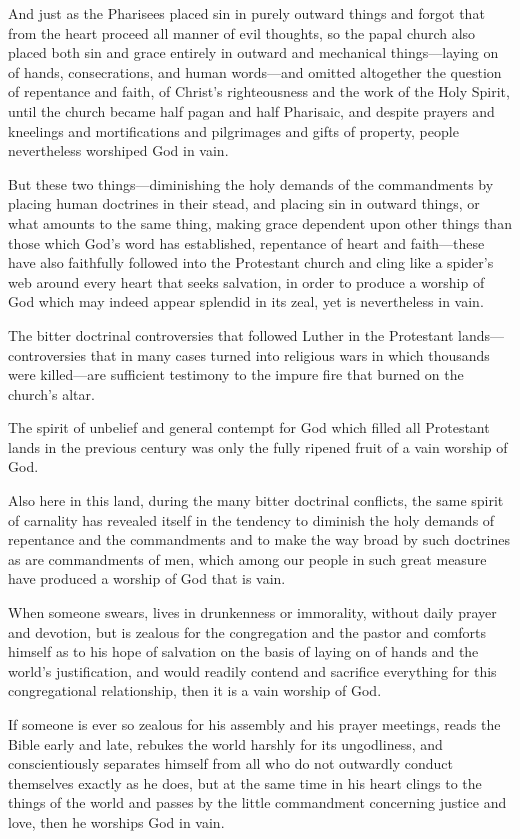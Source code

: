 And just as the Pharisees placed sin in purely outward things and forgot that from the heart proceed all manner of evil thoughts, so the papal church also placed both sin and grace entirely in outward and mechanical things—laying on of hands, consecrations, and human words—and omitted altogether the question of repentance and faith, of Christ's righteousness and the work of the Holy Spirit, until the church became half pagan and half Pharisaic, and despite prayers and kneelings and mortifications and pilgrimages and gifts of property, people nevertheless worshiped God in vain.

But these two things—diminishing the holy demands of the commandments by placing human doctrines in their stead, and placing sin in outward things, or what amounts to the same thing, making grace dependent upon other things than those which God's word has established, repentance of heart and faith—these have also faithfully followed into the Protestant church and cling like a spider’s web around every heart that seeks salvation, in order to produce a worship of God which may indeed appear splendid in its zeal, yet is nevertheless in vain.

The bitter doctrinal controversies that followed Luther in the Protestant lands—controversies that in many cases turned into religious wars in which thousands were killed—are sufficient testimony to the impure fire that burned on the church’s altar.

The spirit of unbelief and general contempt for God which filled all Protestant lands in the previous century was only the fully ripened fruit of a vain worship of God.

Also here in this land, during the many bitter doctrinal conflicts, the same spirit of carnality has revealed itself in the tendency to diminish the holy demands of repentance and the commandments and to make the way broad by such doctrines as are commandments of men, which among our people in such great measure have produced a worship of God that is vain.

When someone swears, lives in drunkenness or immorality, without daily prayer and devotion, but is zealous for the congregation and the pastor and comforts himself as to his hope of salvation on the basis of laying on of hands and the world's justification, and would readily contend and sacrifice everything for this congregational relationship, then it is a vain worship of God.

If someone is ever so zealous for his assembly and his prayer meetings, reads the Bible early and late, rebukes the world harshly for its ungodliness, and conscientiously separates himself from all who do not outwardly conduct themselves exactly as he does, but at the same time in his heart clings to the things of the world and passes by the little commandment concerning justice and love, then he worships God in vain.

